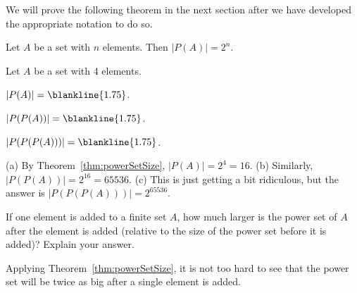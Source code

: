 We will prove the following theorem in the next section after we have developed the appropriate notation to do so.
\begin{thm}\label{thm:powerSetSize}
Let $A$ be a set with $n$ elements.  Then $|P(A)|=2^n$. 
\end{thm}

\begin{exer}
Let $A$ be a set with 4 elements.
\begin{lenum}
\item
$|P(A)|=\blankline{1.75}$.
\item
$|P(P(A))|=\blankline{1.75}$.
\item
$|P(P(P(A)))|=\blankline{1.75}$.
\end{lenum}
\begin{answer}
(a) By Theorem~\ref{thm:powerSetSize}, $|P(A)|=2^4=16$.
(b) Similarly, $|P(P(A))|=2^{16}=65536$.
(c) This is just getting a bit ridiculous, but the answer is $|P(P(P(A)))|=2^{65536}$.
\end{answer}
\end{exer}

\begin{exer}
If one element is added to a finite set $A$, how much larger is the power set of $A$ after the element is added
(relative to the size of the power set before it is added)? Explain your answer.

\noindent
\answerlinethree
\begin{answer}
Applying Theorem~\ref{thm:powerSetSize}, it is not too hard to see that the power set will be
twice as big after a single element is added.
\end{answer}
\end{exer}

